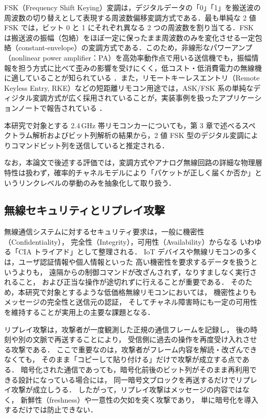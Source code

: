 \documentclass[twocolumn,10pt,a4paper]{jsarticle}
\begin{document}
FSK（Frequency Shift Keying）変調は，デジタルデータの「0」「1」を搬送波の周波数の切り替えとして表現する周波数偏移変調方式である．最も単純な 2 値 FSK では，ビット 0 と 1 にそれぞれ異なる 2 つの周波数を割り当てる．FSK は搬送波の振幅（包絡）をほぼ一定に保ったまま周波数のみを変化させる一定包絡（constant-envelope）の変調方式である．このため，非線形なパワーアンプ（nonlinear power amplifier：PA）を高効率動作点で用いる送信機でも，振幅情報を担う方式に比べて歪みの影響を受けにくく，低コスト・低消費電力の無線機に適していることが知られている \cite{Sklar_DC}．また，リモートキーレスエントリ（Remote Keyless Entry, RKE）などの短距離リモコン用途では，ASK/FSK 系の単純なディジタル変調方式が広く採用されていることが，実装事例を扱ったアプリケーションノートで報告されている \cite{FSK_RemoteAN,RKE_Overview}．

本研究で対象とする 2.4\,GHz 帯リモコンカーについても，第 3 章で述べるスペクトラム解析およびビット列解析の結果から，2 値 FSK 型のデジタル変調によりコマンドビット列を送信していると推定される．

なお，本論文で後述する評価では，変調方式やアナログ無線回路の詳細な物理層特性は扱わず，確率的チャネルモデルにより「パケットが正しく届くか否か」というリンクレベルの挙動のみを抽象化して取り扱う．

\subsection{無線セキュリティとリプレイ攻撃}

無線通信システムに対するセキュリティ要求は，一般に機密性（Confidentiality），
完全性（Integrity），可用性（Availability）からなる
いわゆる「CIA トライアド」として整理される．
IoT デバイスや無線リモコンの多くは，ユーザ認証情報や個人情報といった
高い機密性を要求するデータを扱うというよりも，
遠隔からの制御コマンドが改ざんされず，なりすましなく実行されること，
および正当な操作が途切れずに行えることが重要である．
そのため，本研究で対象とするような低価格無線リモコンにおいては，
機密性よりもメッセージの完全性と送信元の認証，
そしてチャネル障害時にも一定の可用性を維持することが実用上の主要な課題となる．

リプレイ攻撃は，攻撃者が一度観測した正規の通信フレームを記録し，
後の時刻や別の文脈で再送することにより，
受信側に過去の操作を再度受け入れさせる攻撃である．
ここで重要なのは，攻撃者がフレーム内容を解読・改ざんできなくても，
そのまま「コピーして貼り付ける」だけで攻撃が成立する点である．
暗号化された通信であっても，暗号化前後のビット列がそのまま再利用できる設計になっている場合には，
同一暗号文ブロックを再送するだけでリプレイ攻撃が成立しうる．
したがって，リプレイ攻撃はメッセージの内容ではなく，
新鮮性（freshness）や一意性の欠如を突く攻撃であり，
単に暗号化を導入するだけでは防止できない\cite{NISTNonce,SenWSNSurvey}．
\end{document}
